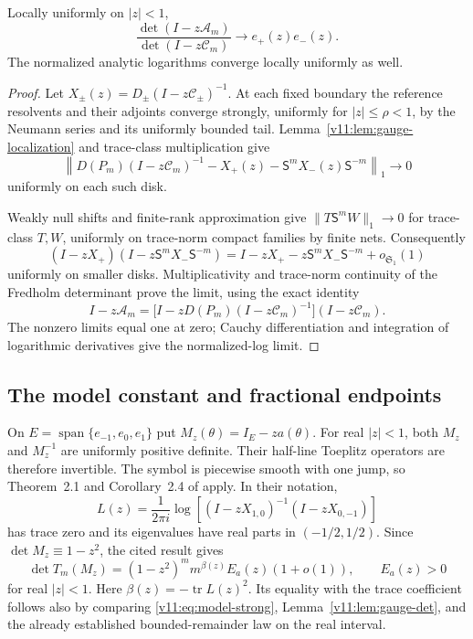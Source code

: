 \begin{lemma}\label{v11:lem:gauge-det}
Locally uniformly on $|z|<1$,
\begin{equation}\label{v11:eq:gauge-det-limit}
 \frac{\det(I-z\mathscr A_m)}{\det(I-z\mathscr C_m)}
       \longrightarrow e_+(z)e_-(z).
\end{equation}
The normalized analytic logarithms converge locally uniformly as well.
\end{lemma}
\begin{proof}
Let $X_\pm(z)=D_\pm(I-z\mathscr C_\pm)^{-1}$.
At each fixed boundary the reference resolvents and their adjoints
converge strongly, uniformly for $|z|\le\rho<1$, by the Neumann series
and its uniformly bounded tail. Lemma~\ref{v11:lem:gauge-localization}
and trace-class multiplication give
\[
 \left\|D(P_m)(I-z\mathscr C_m)^{-1}
       -X_+(z)-\mathsf S^mX_-(z)\mathsf S^{-m}\right\|_1\to0
\]
uniformly on each such disk.

Weakly null shifts and finite-rank approximation give
$\|T\mathsf S^mW\|_1\to0$ for trace-class $T,W$, uniformly on
trace-norm compact families by finite nets.
Consequently
\[
 (I-zX_+)(I-z\mathsf S^mX_-\mathsf S^{-m})
 =I-zX_+-z\mathsf S^mX_-\mathsf S^{-m}+o_{\mathfrak S_1}(1)
\]
uniformly on smaller disks.  Multiplicativity and trace-norm continuity
of the Fredholm determinant prove the limit, using the exact identity
\[
 I-z\mathscr A_m
 =\bigl[I-zD(P_m)(I-z\mathscr C_m)^{-1}\bigr](I-z\mathscr C_m).
\]
The nonzero limits equal one at zero; Cauchy differentiation and
integration of logarithmic derivatives give the normalized-log limit.
\end{proof}

\subsection{The model constant and fractional endpoints}

On $E=\operatorname{span}\{e_{-1},e_0,e_1\}$ put
$M_z(\theta)=I_E-za(\theta)$.  For real $|z|<1$, both $M_z$ and
$M_z^{-1}$ are uniformly positive definite.  Their half-line Toeplitz
operators are therefore invertible.  The symbol is piecewise smooth with
one jump, so Theorem~2.1 and Corollary~2.4 of
\cite{BasorEhrhardtVirtanen2024} apply.  In their notation,
\[
 L(z)=\frac1{2\pi i}
       \log[(I-zX_{1,0})^{-1}(I-zX_{0,-1})]
\]
has trace zero and its eigenvalues have real parts in $(-1/2,1/2)$.
Since $\det M_z\equiv1-z^2$, the cited result gives
\begin{equation}\label{v11:eq:model-strong}
 \det T_m(M_z)=(1-z^2)^m m^{\beta(z)}E_a(z)(1+o(1)),
 \qquad E_a(z)>0
\end{equation}
for real $|z|<1$.  Here $\beta(z)=-\operatorname{tr}L(z)^2$.
Its equality with the trace coefficient follows also by comparing
\eqref{v11:eq:model-strong}, Lemma~\ref{v11:lem:gauge-det}, and the
already established bounded-remainder law on the real interval.

